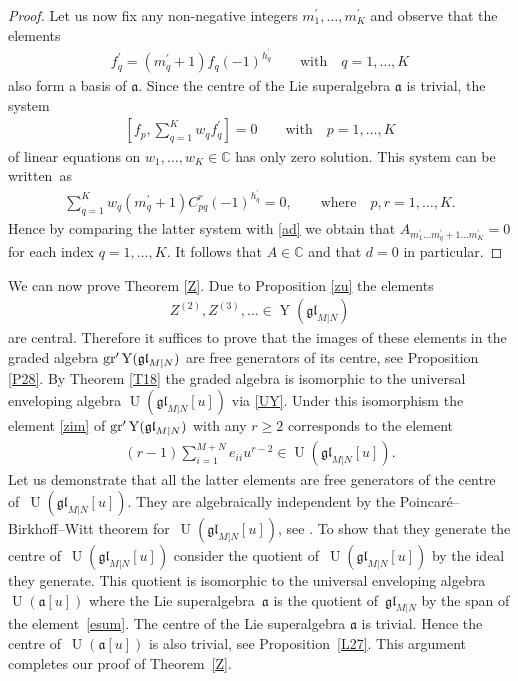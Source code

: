 \documentclass[10pt,a4paper]{amsart}
\numberwithin{equation}{section}
\def\a{\mathfrak{a}}
\def\CC{{\mathbb{C}}}
\def\g{\glMN [u]}
\def\ge{\geqslant}
\def\glMN{\mathfrak{gl}_{M|N}}
\def\grpr{{\rm gr}^{\prime} }
\def\Ua{\operatorname{U}(\a [u])}
\def\Ug{\operatorname{U}(\g)}
\def\YMN{\operatorname{Y}(\glMN)}
\begin{document}
\begin{proof}
Let us now fix any non-negative integers
$m_1^{\prime},\dots,m_K^{\prime}$
and observe that the elements
\begin{gather*}
f_q^{\prime}=(m_q^{\prime}+1) f_q
 (-1)^{h_{q}^{\prime}}
\qquad\text{with}\quad q=1,\dots, K
\end{gather*}
also form a basis of $\a $. Since the centre of
the Lie superalgebra $\a$ is trivial, the system
\begin{gather*}
\left[ f_p , \sum_{q=1}^K w_{q} f_q^{\prime} \right]=0
\qquad\text{with}\quad
p=1,\dots, K
\end{gather*}
of linear equations on $w_{1},\dots, w_{K}\in\CC$
has only zero solution. This system can be written~as
\begin{gather*}
\sum_{q=1}^K w_{q}
(m^{\prime}_q+1) C_{pq}^{r} (-1)^{h_{q}^{\prime}}=0,
\qquad\text{where}\quad
p ,r=1,\dots, K .
\end{gather*}
Hence by comparing the latter system with \eqref{ad} we obtain that
$A_{m_1^{\prime}\dots m^{\prime}_q+1\dots m^{\prime}_K}=0$
for each index $q=1,\dots, K $. It follows that $A\in\CC$
and that $d=0$ in particular.
\end{proof}

We can now prove Theorem \ref{Z}.
Due to Proposition \ref{zu} the elements
\begin{gather*}
Z^{(2)},Z^{(3)},\ldots\in\YMN
\end{gather*}
are central. Therefore it suffices to
prove that the images of these elements in the graded algebra
$\grpr\YMN$ are free generators of its centre, see Proposition \ref{P28}.
By Theorem \ref{T18} the graded algebra
is isomorphic to the universal enveloping algebra
$\Ug$ via \eqref{UY}. Under this isomorphism the element \eqref{zim}
of $\grpr\YMN$ with any $r\ge2$ corresponds to the element
\begin{gather*}
( r-1 ) \sum_{i=1}^{M+N}e_{ii} u^{r-2}\in\Ug .
\end{gather*}
Let us demonstrate that all the latter elements
are free generators of the centre of~$\Ug $.
They are algebraically independent
by the Poincar\'e--Birkhoff--Witt theorem for~$\Ug $, see \cite[Theorem~5.15]{MM}.
To show that they generate the centre of~$\Ug$ consider
the quotient of~$\Ug$ by the ideal
they generate. This quotient
is isomorphic to the universal enveloping algebra~$\Ua$
where the Lie superalgebra~$\a$ is the quotient of~$\glMN$ by the span of the element~\eqref{esum}.
The centre of the Lie superalgebra $\a$ is trivial.
Hence the centre of~$\Ua$ is also trivial, see Proposition~\ref{L27}.
This argument completes our proof of Theorem~\ref{Z}.
\end{document}
